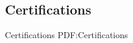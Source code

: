 \documentclass[a4paper,10pt,oneside]{article}
\begin{document}
\begin{body}











\section
{Certifications}
{Certifications}
{PDF:Certifications}





\end{body}
\end{document}
